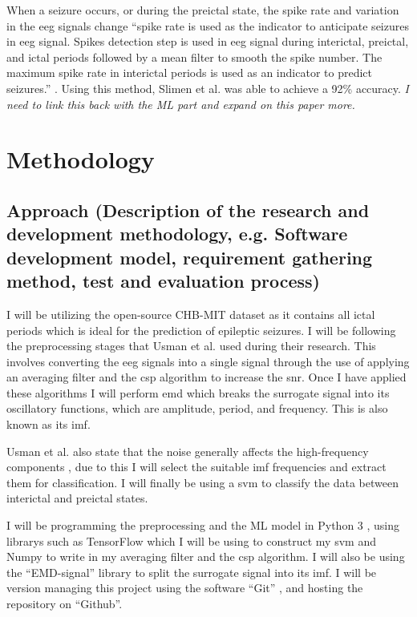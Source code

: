 \documentclass[12pt]{article}
\begin{document}
When a seizure occurs, or during the preictal state, the spike rate and variation in the \acrshort{eeg} signals change \cite{lange1983temporo} \cite{truccolo2011single} ``spike rate is used as the indicator to anticipate seizures in \acrfull{eeg} signal. Spikes detection step is used in \acrshort{eeg} signal during interictal, preictal, and ictal periods followed by a mean filter to smooth the spike number. The maximum spike rate in interictal periods is used as an indicator to predict seizures.'' \cite{slimen2020epileptic}. Using this method, Slimen et al. was able to achieve a 92\% accuracy. \textit{I need to link this back with the ML part and expand on this paper more.}

\section{Methodology}

\subsection{Approach (Description of the research and development methodology, e.g. Software
development model, requirement gathering method, test and evaluation process)}

I will be utilizing the open-source CHB-MIT dataset \cite{shoeb2009application} \cite{PhysioNet} as it contains all ictal periods which is ideal for the prediction of epileptic seizures. I will be following the preprocessing stages that Usman et al. used during their research. This involves converting the \acrshort{eeg} signals into a single signal through the use of applying an averaging filter and the \acrfull{csp} algorithm to increase the \acrshort{snr}. Once I have applied these algorithms I will perform \acrshort{emd} which breaks the surrogate signal into its oscillatory functions, which are amplitude, period, and frequency. This is also known as its \acrfull{imf}.

Usman et al. also state that the noise generally affects the high-frequency components \cite{usman2017epileptic}, due to this I will select the suitable \acrshort{imf} frequencies and extract them for classification. I will finally be using a \acrshort{svm} to classify the data between interictal and preictal states.

I will be programming the preprocessing and the ML model in Python 3 \cite{python3}, using librarys such as TensorFlow \cite{tensorflow2015-whitepaper} which I will be using to construct my \acrshort{svm} and Numpy \cite{harris2020array} to write in my averaging filter and the \acrshort{csp} algorithm. I will also be using the ``EMD-signal'' library \cite{pyemd} to split the surrogate signal into its \acrshort{imf}. I will be version managing this project using the software ``Git'' , and hosting the repository on ``Github''.
\end{document}
